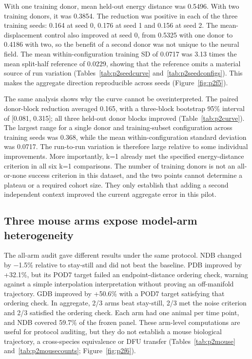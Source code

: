 With one training donor, mean held-out energy distance was 0.5496. With two training donors, it was 0.3854. The reduction was positive in each of the three training seeds: 0.164 at seed 0, 0.176 at seed 1 and 0.156 at seed 2. The mean-displacement control also improved at seed 0, from 0.5325 with one donor to 0.4186 with two, so the benefit of a second donor was not unique to the neural field. The mean within-configuration training SD of 0.0717 was 3.13 times the mean split-half reference of 0.0229, showing that the reference omits a material source of run variation (Tables~\ref{tab:p2seedcurve} and~\ref{tab:p2seedconfigs}). This makes the aggregate direction reproducible across seeds (Figure~\ref{fig:p2f5}\label{call:p2f5}).



The same analysis shows why the curve cannot be overinterpreted. The paired donor-block reduction averaged 0.165, with a three-block bootstrap 95\% interval of {[}0.081, 0.315{]}; all three held-out donor blocks improved (Table~\ref{tab:p2curve}). The largest range for a single donor and training-subset configuration across training seeds was 0.368, while the mean within-configuration standard deviation was 0.0717. The run-to-run variation is therefore large relative to some individual improvements. More importantly, k=1 already met the specified energy-distance criterion in all six k=1 comparisons. The number of training donors is not an all-or-none success criterion in this dataset, and the two points cannot determine a plateau or a required cohort size. They only establish that adding a second independent context improved the current aggregate error in this pilot.

\subsection{Three mouse arms expose model-arm heterogeneity}

The all-arm audit gave different results under the same protocol. NDB changed by −1.5\% relative to stay-still and did not beat the baseline. PDB improved by +32.1\%, but its POD7 target failed an endpoint-distance ordering check, warning against a simple interpolation interpretation without proving an off-manifold trajectory. GDB improved by +50.6\% with a POD7 target satisfying that ordering check. In aggregate, 2/3 arms beat stay-still, 2/3 met the noise criterion and 2/3 satisfied the ordering check. Each arm had one animal per time point, and NDB covered 59.7\% of the frozen panel. These arm-level computations are useful for protocol auditing, but they do not establish a mouse biological trajectory, a cross-species equivalence or DFU transfer (Tables~\ref{tab:p2mouse} and~\ref{tab:p2mousecounts}; Figure~\ref{fig:p2f6}\label{call:p2f6}).


